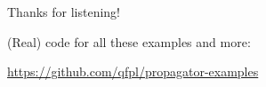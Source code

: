 \documentclass[UKenglish,usenames,dvipsnames,svgnames,table,aspectratio=169,mathserif]{beamer}
\newcommand{\nl}{\vspace{\baselineskip}}
\begin{document}





\begin{frame}
\huge \centering
Thanks for listening!
\nl

\large
(Real) code for all these examples and more:

\url{https://github.com/qfpl/propagator-examples}

\end{frame}
\end{document}
